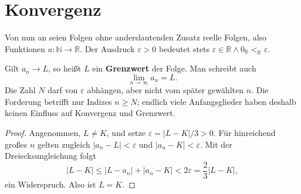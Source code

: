\documentclass[main.tex]{subfiles}
\providecommand{\RealLt}{\mathrel{<_{\mathbb R}}}
\providecommand{\RealZero}{0_{\mathbb R}}
\begin{document}
\section{Konvergenz}

Von nun an seien Folgen ohne anderslautenden Zusatz reelle Folgen, also
Funktionen \(a\colon\mathbb N\to\mathbb R\). Der Ausdruck
\(\varepsilon>0\) bedeutet stets
\(\varepsilon\in\mathbb R\land\RealZero\RealLt\varepsilon\).


Gilt \(a_n\to L\), so heißt \(L\) ein \textbf{Grenzwert} der Folge. Man
schreibt auch
\[
  \lim_{n\to\infty}a_n=L.
\]
Die Zahl \(N\) darf von \(\varepsilon\) abhängen, aber nicht vom später
gewählten \(n\). Die Forderung betrifft nur Indizes \(n\geq N\); endlich
viele Anfangsglieder haben deshalb keinen Einfluss auf Konvergenz und
Grenzwert.


\begin{proof}
Angenommen, \(L\neq K\), und setze
\(\varepsilon=|L-K|/3>0\). Für hinreichend großes \(n\) gelten zugleich
\(|a_n-L|<\varepsilon\) und \(|a_n-K|<\varepsilon\). Mit der
Dreiecksungleichung folgt
\[
  |L-K|\leq |L-a_n|+|a_n-K|
  <2\varepsilon=\frac23|L-K|,
\]
ein Widerspruch. Also ist \(L=K\).
\end{proof}
\end{document}
